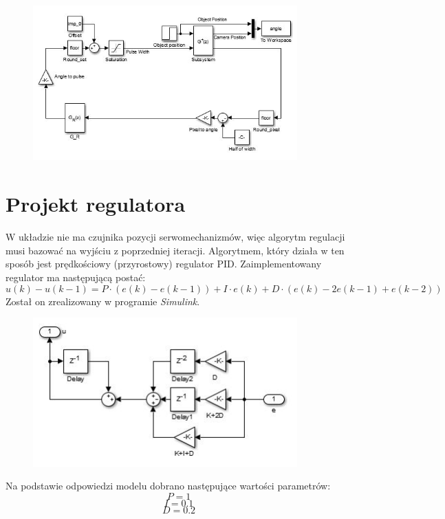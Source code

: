 \begin{figure}[h]
	\centering
	\includegraphics[width=4in]{Simulink.jpg}
\end{figure}

\section{Projekt regulatora}
\label{sec:projektregulatora}

W układzie nie ma czujnika pozycji serwomechanizmów, więc algorytm regulacji musi bazować na wyjściu z poprzedniej iteracji. Algorytmem, który działa w ten sposób jest prędkościowy (przyrostowy) regulator PID. Zaimplementowany regulator ma następującą postać:
\begin{equation}
u(k)-u(k-1)=P \cdot (e(k)-e(k-1))+I \cdot e(k)+D \cdot (e(k)-2e(k-1)+e(k-2))
\end{equation}
Został on zrealizowany w programie \textit{Simulink}.

\begin{figure}[h]
	\centering
	\includegraphics[width=4in]{Przyrostowy.jpg}
\end{figure}

Na podstawie odpowiedzi modelu dobrano następujące wartości parametrów:
\begin{equation}
P=1
\end{equation}
\begin{equation}
I=0.1
\end{equation}
\begin{equation}
D=0.2
\end{equation}

